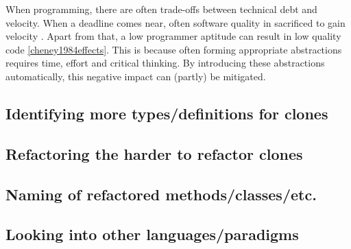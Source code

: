 When programming, there are often trade-offs between technical debt and velocity. When a deadline comes near, often software quality in sacrificed to gain velocity \cite{costello1984software, austin2001effects, shah2014global}. Apart from that, a low programmer aptitude can result in low quality code \ref{cheney1984effects}. This is because often forming appropriate abstractions requires time, effort and critical thinking. By introducing these abstractions automatically, this negative impact can (partly) be mitigated.

\subsection{Identifying more types/definitions for clones}

\subsection{Refactoring the harder to refactor clones}

\subsection{Naming of refactored methods/classes/etc.}

\subsection{Looking into other languages/paradigms}
